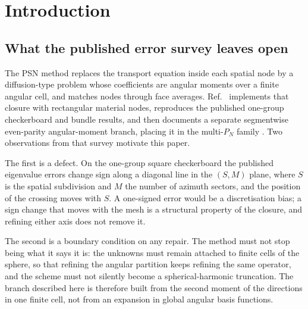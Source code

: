 \documentclass[11pt,a4paper]{article}
\begin{document}
\section{Introduction}

\subsection{What the published error survey leaves open}
The PSN method \cite{psn2027} replaces the transport equation inside each spatial
node by a diffusion-type problem whose coefficients are angular moments over a
finite angular cell, and matches nodes through face averages. Ref.~\cite{openpsn2026}
implements that closure with rectangular material nodes, reproduces the published
one-group checkerboard and bundle results, and then documents a separate
segmentwise even-parity angular-moment branch, placing it in the multi-$P_N$ family
\cite{ghazaie2019mpn,falabino2022mpn}. Two observations from that survey motivate
this paper.

The first is a defect. On the one-group square checkerboard the published
eigenvalue errors change sign along a diagonal line in the
$(S,M)$ plane, where $S$ is the spatial subdivision and $M$ the number of azimuth
sectors, and the position of the crossing moves with $S$. A one-signed error would
be a discretisation bias; a sign change that moves with the mesh is a structural
property of the closure, and refining either axis does not remove it.

The second is a boundary condition on any repair. The method must not stop being
what it says it is: the unknowns must remain attached to finite cells of the
sphere, so that refining the angular partition keeps refining the same operator,
and the scheme must not silently become a spherical-harmonic truncation. The
branch described here is therefore built from the second moment of the directions
in one finite cell, not from an expansion in global angular basis functions.
\end{document}
